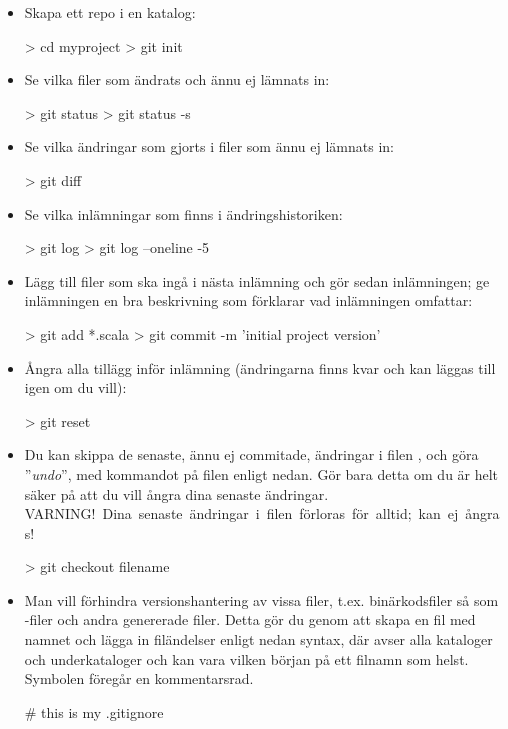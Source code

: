 \begin{itemize}[leftmargin=*]

\item Skapa ett repo i en katalog:
\begin{REPLnonum}
> cd myproject
> git init
\end{REPLnonum} 

\item Se vilka filer som ändrats och ännu ej lämnats in:
\begin{REPLnonum}
> git status
> git status -s
\end{REPLnonum} 

\item Se vilka ändringar som gjorts i filer som ännu ej lämnats in:
\begin{REPLnonum}
> git diff 
\end{REPLnonum} 

\item Se vilka inlämningar som finns i ändringshistoriken:
\begin{REPLnonum}
> git log 
> git log --oneline -5
\end{REPLnonum} 

\item Lägg till filer som ska ingå i nästa inlämning och gör sedan inlämningen; ge inlämningen en bra beskrivning som förklarar vad inlämningen omfattar:
\begin{REPLnonum}
> git add *.scala
> git commit -m 'initial project version'
\end{REPLnonum} 

\item Ångra alla tillägg inför inlämning (ändringarna finns kvar och kan läggas till igen om du vill):
\begin{REPLnonum}
> git reset 
\end{REPLnonum} 

\item Du kan skippa de senaste, ännu ej commitade, ändringar i filen , och göra ''\textit{undo}'', med kommandot  på filen enligt nedan. Gör bara detta om du är helt säker på att du vill ångra dina senaste ändringar.
\\ \mbox{\colorbox{red!30}{VARNING!} Dina senaste ändringar i filen förloras för alltid; kan ej ångras!}   
\begin{REPLnonum}
> git checkout filename 
\end{REPLnonum} 

\item Man vill förhindra versionshantering av vissa filer, t.ex. binärkodsfiler så som -filer och andra genererade filer. Detta gör du genom att skapa en fil med namnet  och lägga in filändelser enligt nedan syntax, där \code{**/} avser alla kataloger och underkataloger och \code{*} kan vara vilken början på ett filnamn som helst. Symbolen \code{#} föregår en kommentarsrad.
\begin{Code}[language=]
# this is my .gitignore


\end{Code}
\end{itemize}
